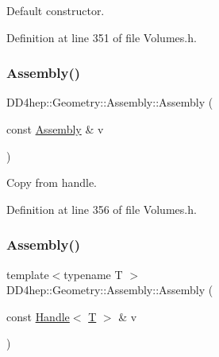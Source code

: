 Default constructor. 



Definition at line 351 of file Volumes.\+h.

\hypertarget{class_d_d4hep_1_1_geometry_1_1_assembly_a8eb0042bd057b80ad9e4e3e716de4399}{}\label{class_d_d4hep_1_1_geometry_1_1_assembly_a8eb0042bd057b80ad9e4e3e716de4399} 
\subsubsection{\texorpdfstring{Assembly()}{Assembly()}\hspace{0.1cm}{\footnotesize\ttfamily [2/4]}}
{\footnotesize\ttfamily D\+D4hep\+::\+Geometry\+::\+Assembly\+::\+Assembly (\begin{DoxyParamCaption}\item[{const \hyperlink{class_d_d4hep_1_1_geometry_1_1_assembly}{Assembly} \&}]{v }\end{DoxyParamCaption})\hspace{0.3cm}{\ttfamily [inline]}}



Copy from handle. 



Definition at line 356 of file Volumes.\+h.

\hypertarget{class_d_d4hep_1_1_geometry_1_1_assembly_a0d1dbff35d62862a6bebf04d9a4d175e}{}\label{class_d_d4hep_1_1_geometry_1_1_assembly_a0d1dbff35d62862a6bebf04d9a4d175e} 
\subsubsection{\texorpdfstring{Assembly()}{Assembly()}\hspace{0.1cm}{\footnotesize\ttfamily [3/4]}}
{\footnotesize\ttfamily template$<$typename T $>$ \\
D\+D4hep\+::\+Geometry\+::\+Assembly\+::\+Assembly (\begin{DoxyParamCaption}\item[{const \hyperlink{class_d_d4hep_1_1_handle}{Handle}$<$ \hyperlink{class_t}{T} $>$ \&}]{v }\end{DoxyParamCaption})\hspace{0.3cm}{\ttfamily [inline]}}



